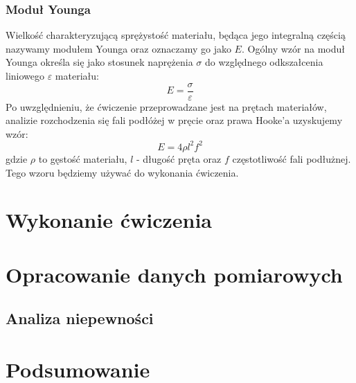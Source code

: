 \documentclass[a4paper,12pts]{article}
\begin{document}
	\subsubsection{Moduł Younga}
	Wielkość charakteryzującą sprężystość materiału, będąca jego integralną częścią nazywamy modułem Younga oraz oznaczamy go jako $E$. Ogólny wzór na moduł Younga określa się jako stosunek naprężenia $\sigma$ do względnego odkszałcenia liniowego $\varepsilon$ materiału:
	\begin{equation}
		E = \frac{\sigma}{\varepsilon}
	\end{equation}
	Po uwzględnieniu, że ćwiczenie przeprowadzane jest na prętach materiałów, analizie rozchodzenia się fali podłóżej w pręcie oraz prawa Hooke'a uzyskujemy wzór:
	\begin{equation}
		E = 4 \rho l^2 f^2
	\end{equation}
	gdzie $\rho$ to gęstość materiału, $l$ - długość pręta oraz $f$ częstotliwość fali podłużnej. Tego wzoru będziemy używać do wykonania ćwiczenia.
	
	
	
	
	\section{Wykonanie ćwiczenia}
	
	
	\section{Opracowanie danych pomiarowych}
	
	
	\subsection{Analiza niepewności}
	

	\section{Podsumowanie}

	
\end{document}
